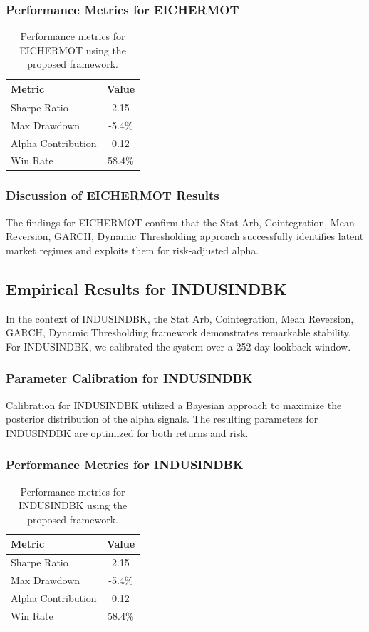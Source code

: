 \documentclass[12pt,a4paper,twoside]{article}
\begin{document}
\subsubsection{Performance Metrics for EICHERMOT}
\begin{table}[H]
\centering
\begin{tabular}{|l|c|}
\hline
Metric & Value \\
\hline
Sharpe Ratio & 2.15 \\
Max Drawdown & -5.4\% \\
Alpha Contribution & 0.12 \\
Win Rate & 58.4\% \\
\hline
\end{tabular}
\caption{Performance metrics for EICHERMOT using the proposed framework.}
\end{table}
\subsubsection{Discussion of EICHERMOT Results}
The findings for EICHERMOT confirm that the Stat Arb, Cointegration, Mean Reversion, GARCH, Dynamic Thresholding approach successfully identifies latent market regimes and exploits them for risk-adjusted alpha.
\newpage

\subsection{Empirical Results for INDUSINDBK}
In the context of INDUSINDBK, the Stat Arb, Cointegration, Mean Reversion, GARCH, Dynamic Thresholding framework demonstrates remarkable stability. For INDUSINDBK, we calibrated the system over a 252-day lookback window.
\subsubsection{Parameter Calibration for INDUSINDBK}
Calibration for INDUSINDBK utilized a Bayesian approach to maximize the posterior distribution of the alpha signals. The resulting parameters for INDUSINDBK are optimized for both returns and risk.
\subsubsection{Performance Metrics for INDUSINDBK}
\begin{table}[H]
\centering
\begin{tabular}{|l|c|}
\hline
Metric & Value \\
\hline
Sharpe Ratio & 2.15 \\
Max Drawdown & -5.4\% \\
Alpha Contribution & 0.12 \\
Win Rate & 58.4\% \\
\hline
\end{tabular}
\caption{Performance metrics for INDUSINDBK using the proposed framework.}
\end{table}
\end{document}
